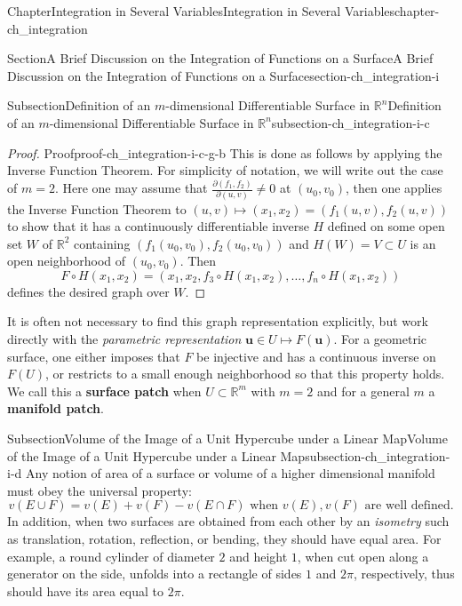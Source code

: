 \documentclass[oneside,10pt,]{book}
\newcommand{\terminology}[1]{\textbf{#1}}
\numberwithin{equation}{section}
\newcommand{\bu}{\mathbf{u}}
\newcommand{\bbR}{\mathbb{R}}
\begin{document}
\begin{chapterptx}{Chapter}{Integration in Several Variables}{}{Integration in Several Variables}{}{}{chapter-ch_integration}
\begin{sectionptx}{Section}{A Brief Discussion on the Integration of Functions on a Surface}{}{A Brief Discussion on the Integration of Functions on a Surface}{}{}{section-ch_integration-i}
\begin{subsectionptx}{Subsection}{Definition of an \(m\)-dimensional Differentiable Surface in \(\bbR^{n}\)}{}{Definition of an \(m\)-dimensional Differentiable Surface in \(\bbR^{n}\)}{}{}{subsection-ch_integration-i-c}
\begin{proof}{Proof}{}{proof-ch_integration-i-c-g-b}
This is done as follows by applying the Inverse Function Theorem. For simplicity of notation, we will write out the case of \(m=2\). Here one may assume that \(\frac{\partial (f_{1}, f_{2})}{\partial (u, v)} \ne 0\) at \((u_{0}, v_{0})\), then one applies the Inverse Function Theorem to \((u, v)\mapsto (x_{1}, x_{2})=(f_{1}(u,v), f_{2}(u,v))\) to show that it has a continuously differentiable inverse \(H\) defined on some open set \(W\) of \(\mathbb R^{2}\) containing \((f_{1}(u_{0},v_{0}), f_{2}(u_{0},v_{0}))\) and \(H(W)=V\subset U\) is an open neighborhood of \((u_{0}, v_{0})\). Then%
\begin{equation*}
F\circ H(x_{1}, x_{2})=
(x_{1}, x_{2}, f_{3}\circ H(x_{1}, x_{2}),\ldots, f_{n}\circ H(x_{1}, x_{2})) 
\end{equation*}
defines the desired graph over \(W\).%
\end{proof}
It is often not necessary to find this graph representation explicitly, but work directly with the \emph{parametric representation} \(\bu \in U\mapsto F(\bu)\). For  a geometric surface, one either imposes that \(F\) be injective and has a continuous inverse on \(F(U)\), or restricts to a small enough neighborhood	so that this property holds. We call this  a \terminology{surface patch} when \(U\subset \bbR^{m}\) with \(m=2\) and for a general \(m\) a \terminology{manifold patch}.%
\end{subsectionptx}
%
%
\typeout{************************************************}
\typeout{************************************************}
%
\begin{subsectionptx}{Subsection}{Volume of the Image of a Unit Hypercube under a Linear Map}{}{Volume of the Image of a Unit Hypercube under a Linear Map}{}{}{subsection-ch_integration-i-d}
Any notion of area of a surface or volume of a higher dimensional manifold must obey the universal property:%
\begin{equation}
v(E\cup F)=v(E)+v(F)-v(E\cap F) \text{ when $v(E), v(F)$ are well defined.}\label{men-area1}
\end{equation}
In addition, when two surfaces are obtained from each other by an \emph{isometry} such as translation, rotation, reflection, or bending, they should have equal area. For example, a round cylinder of diameter \(2\) and height \(1\), when cut open along a generator on the side, unfolds into a rectangle of sides \(1\) and \(2\pi\), respectively, thus should have its area equal to \(2\pi\).%
\par

\end{subsectionptx}
\end{sectionptx}
\end{chapterptx}
\end{document}
